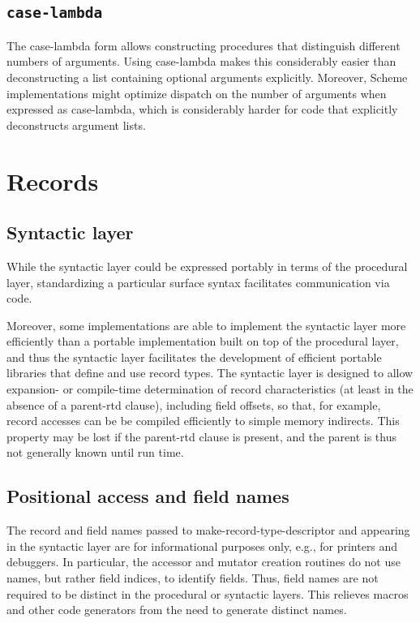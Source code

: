 \documentclass[twoside,twocolumn]{algol60}
\begin{document}
\section{{\tt case-lambda}}

The {\cf case-lambda} form allows constructing procedures that
distinguish different numbers of arguments.  Using {\cf case-lambda}
makes this considerably easier than deconstructing a list containing
optional arguments explicitly.  Moreover, Scheme implementations might
optimize dispatch on the number of arguments when expressed as {\cf
  case-lambda}, which is considerably harder for code that explicitly
deconstructs argument lists.

\chapter{Records}


\section{Syntactic layer}

While the syntactic layer could be expressed portably in terms of the
procedural layer, standardizing a particular surface syntax
facilitates communication via code.

Moreover, some implementations are able to implement the syntactic
layer more efficiently than a portable implementation built on top of
the procedural layer, and thus the syntactic layer facilitates the
development of efficient portable libraries that define and use record
types.  The syntactic layer is designed to allow expansion- or
compile-time determination of record characteristics (at least in the
absence of a {\cf parent-rtd} clause), including field offsets, so
that, for example, record accesses can be be compiled efficiently to
simple memory indirects.  This property may be lost if the {\cf
  parent-rtd} clause is present, and the parent is thus not generally
known until run time.

\section{Positional access and field names}

The record and field names passed to {\cf make-record-type-descriptor}
and appearing in the syntactic layer are for informational purposes
only, e.g., for printers and debuggers.  In particular, the accessor
and mutator creation routines do not use names, but rather field
indices, to identify fields.
Thus, field names are not required to be distinct in the procedural or
syntactic layers.  This relieves macros and other code generators from
the need to generate distinct names.
\end{document}
